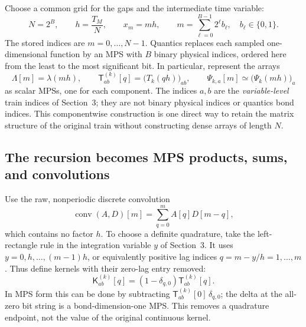 \documentclass[11pt]{article}
\begin{document}
Choose a common grid for the gaps and the intermediate time variable:
\begin{equation}
    N=2^B,\qquad h=\frac{T_M}{N},\qquad x_m=mh,
    \qquad m=\sum_{\ell=0}^{B-1}2^\ell b_\ell,
    \quad b_\ell\in\{0,1\}.
\end{equation}
The stored indices are $m=0,\ldots,N-1$. Quantics replaces each sampled
one-dimensional function by an MPS with $B$ binary physical indices,
ordered here from the least to the most significant bit. In particular,
represent the arrays
\begin{equation}
    \Lambda[m]=\lambda(mh),\qquad
    \mathsf T^{(k)}_{ab}[q]={\bigl(T_k(qh)\bigr)}_{ab},
    \qquad \Psi_{k,a}[m]\simeq{\bigl(\Psi_k(mh)\bigr)}_a
\end{equation}
as scalar MPSs, one for each component. The indices $a,b$ are the
\emph{variable-level} train indices of Section~3; they are not binary
physical indices or quantics bond indices. This componentwise construction
is one direct way to retain the matrix structure of the original train
without constructing dense arrays of length $N$.

\subsection{The recursion becomes MPS products, sums, and convolutions}

Use the raw, nonperiodic discrete convolution
\begin{equation}
    \operatorname{conv}(A,D)[m]=\sum_{q=0}^m A[q]D[m-q],
    \label{eq:raw_quantics_conv}
\end{equation}
which contains no factor $h$. To choose a definite quadrature, take the
left-rectangle rule in the integration variable $y$ of Section~3.
It uses $y=0,h,\ldots,(m-1)h$, or equivalently positive lag indices
$q=m-y/h=1,\ldots,m$. Thus define kernels with their zero-lag entry removed:
\begin{equation}
    \mathsf K^{(k)}_{ab}[q]=(1-\delta_{q,0})\mathsf T^{(k)}_{ab}[q].
    \label{eq:positive_lag_kernel}
\end{equation}
In MPS form this can be done by subtracting
$\mathsf T^{(k)}_{ab}[0]\,\delta_{q,0}$; the delta at the all-zero bit
string is a bond-dimension-one MPS\@. This removes a quadrature endpoint,
not the value of the original continuous kernel.
\end{document}
